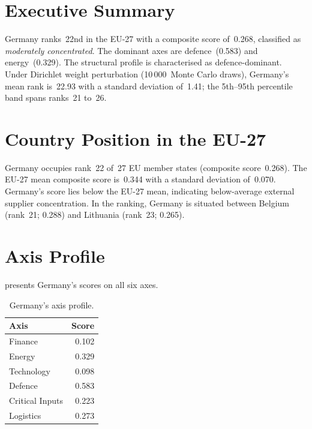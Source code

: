 \documentclass[12pt,a4paper]{article}
\begin{document}
\hypersetup{pageanchor=true}
\pagestyle{fancy}
\renewcommand{\headrulewidth}{0.4pt}


\section{Executive Summary}
\label{sec:summary}

Germany ranks~22nd in the EU-27 with a composite \ISI score of~0.268, classified as \emph{moderately concentrated}.  The dominant axes are defence~(0.583) and energy~(0.329).  The structural profile is characterised as defence-dominant.  Under Dirichlet weight perturbation (10\,000~Monte Carlo draws), Germany's mean rank is~22.93 with a standard deviation of~1.41; the 5th--95th percentile band spans ranks~21 to~26.


\section{Country Position in the EU-27}
\label{sec:position}

Germany occupies rank~22 of~27 EU member states (composite score~0.268).  The EU-27 mean composite score is~0.344 with a standard deviation of~0.070.  Germany's score lies below the EU-27 mean, indicating below-average external supplier concentration.  In the ranking, Germany is situated between Belgium (rank~21; 0.288) and Lithuania (rank~23; 0.265).


\section{Axis Profile}
\label{sec:axis-profile}

 presents Germany's scores on all six \ISI axes.

\begin{table}[htbp]
\centering\small
\caption{Germany's \ISI axis profile.}
\label{tab:axis-profile}
\begin{tabular}{@{}lr@{}}
\toprule
\textbf{Axis} & \textbf{Score} \\
\midrule
    Finance           & 0.102 \\
    Energy            & 0.329 \\
    Technology        & 0.098 \\
    Defence           & 0.583 \\
    Critical Inputs   & 0.223 \\
    Logistics         & 0.273 \\
\bottomrule
\end{tabular}
\end{table}
\end{document}
